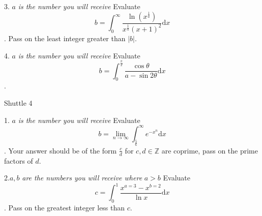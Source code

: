 \documentclass[11pt, a4paper]{article}
\newcommand{\dd}{\mathrm{d}}
\begin{document}
\begin{enumerate}

3. $a$\textit{ is the number you will receive} \newline Evaluate $$b=\int_0^{\infty} \frac{\ln(x^{\frac{1}{a}})}{x^{\frac{1}{a}}(x+1)^2} \dd x$$. Pass on the least integer greater than $|b|$. \newline  \newline \newline \newline \newline \newline  

4. $a$\textit{ is the number you will receive} \newline Evaluate $$b=\int_0^{\frac{\pi}{2}} \frac{\cos{\theta}}{a-\sin{2\theta}} \dd x$$.
\newpage

Shuttle 4

1. $a$\textit{ is the number you will receive} \newline Evaluate $$b=\lim_{n \to \infty} \int_{\frac{5}{6}}^{\infty} e^{-x^n} \dd x$$. Your answer should be of the form $\frac{c}{d}$ for $c,d \in \mathbb{Z}$ are coprime, pass on the prime factors of $d$. \newline  \newline \newline \newline \newline \newline 


2.$a,b$\textit{ are the numbers you will receive where }$a>b$ \newline Evaluate $$c=\int_0^1 \frac{x^{a=3}-x^{b=2}}{\ln{x}} \dd x$$. Pass on the greatest integer less than $c$. \newline  \newline \newline \newline \newline \newline


\end{enumerate}
\end{document}
